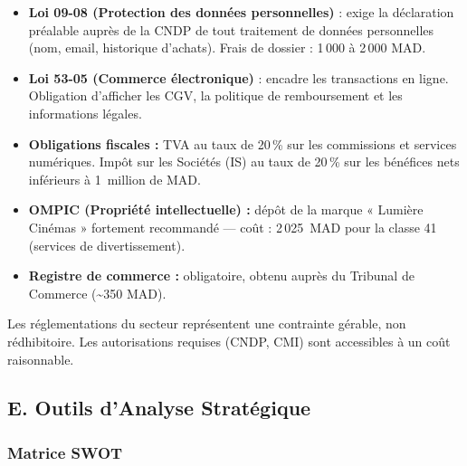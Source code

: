 \documentclass[12pt,a4paper,openany]{report}
\begin{document}
\begin{itemize}
  \item \textbf{Loi 09-08 (Protection des données personnelles)} : exige la déclaration préalable auprès de la CNDP de tout traitement de données personnelles (nom, email, historique d'achats). Frais de dossier : 1\,000 à 2\,000 MAD.
  \item \textbf{Loi 53-05 (Commerce électronique)} : encadre les transactions en ligne. Obligation d'afficher les CGV, la politique de remboursement et les informations légales.
  \item \textbf{Obligations fiscales :} TVA au taux de 20\,\% sur les commissions et services numériques. Impôt sur les Sociétés (IS) au taux de 20\,\% sur les bénéfices nets inférieurs à 1~million de MAD.
  \item \textbf{OMPIC (Propriété intellectuelle) :} dépôt de la marque « Lumière Cinémas » fortement recommandé — coût : 2\,025~MAD pour la classe 41 (services de divertissement).
  \item \textbf{Registre de commerce :} obligatoire, obtenu auprès du Tribunal de Commerce (\textasciitilde{}350 MAD).
\end{itemize}

Les réglementations du secteur représentent une contrainte gérable, non rédhibitoire. Les autorisations requises (CNDP, CMI) sont accessibles à un coût raisonnable.

\subsection{E. Outils d'Analyse Stratégique}

\subsubsection{Matrice SWOT}
\end{document}
